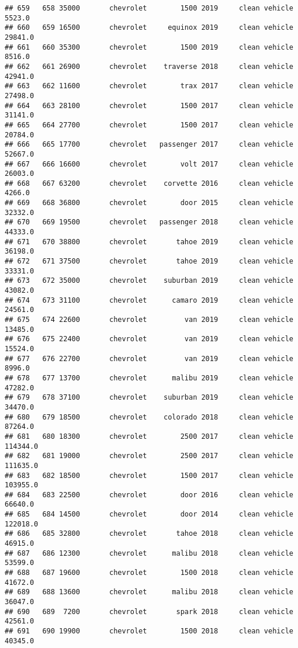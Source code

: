 \documentclass[
]{article}
\begin{document}
\begin{verbatim}
## 659   658 35000       chevrolet        1500 2019     clean vehicle    5523.0
## 660   659 16500       chevrolet     equinox 2019     clean vehicle   29841.0
## 661   660 35300       chevrolet        1500 2019     clean vehicle    8516.0
## 662   661 26900       chevrolet    traverse 2018     clean vehicle   42941.0
## 663   662 11600       chevrolet        trax 2017     clean vehicle   27498.0
## 664   663 28100       chevrolet        1500 2017     clean vehicle   31141.0
## 665   664 27700       chevrolet        1500 2017     clean vehicle   20784.0
## 666   665 17700       chevrolet   passenger 2017     clean vehicle   52667.0
## 667   666 16600       chevrolet        volt 2017     clean vehicle   26003.0
## 668   667 63200       chevrolet    corvette 2016     clean vehicle    4266.0
## 669   668 36800       chevrolet        door 2015     clean vehicle   32332.0
## 670   669 19500       chevrolet   passenger 2018     clean vehicle   44333.0
## 671   670 38800       chevrolet       tahoe 2019     clean vehicle   36198.0
## 672   671 37500       chevrolet       tahoe 2019     clean vehicle   33331.0
## 673   672 35000       chevrolet    suburban 2019     clean vehicle   43082.0
## 674   673 31100       chevrolet      camaro 2019     clean vehicle   24561.0
## 675   674 22600       chevrolet         van 2019     clean vehicle   13485.0
## 676   675 22400       chevrolet         van 2019     clean vehicle   15524.0
## 677   676 22700       chevrolet         van 2019     clean vehicle    8996.0
## 678   677 13700       chevrolet      malibu 2019     clean vehicle   47282.0
## 679   678 37100       chevrolet    suburban 2019     clean vehicle   34470.0
## 680   679 18500       chevrolet    colorado 2018     clean vehicle   87264.0
## 681   680 18300       chevrolet        2500 2017     clean vehicle  114344.0
## 682   681 19000       chevrolet        2500 2017     clean vehicle  111635.0
## 683   682 18500       chevrolet        1500 2017     clean vehicle  103955.0
## 684   683 22500       chevrolet        door 2016     clean vehicle   66640.0
## 685   684 14500       chevrolet        door 2014     clean vehicle  122018.0
## 686   685 32800       chevrolet       tahoe 2018     clean vehicle   46915.0
## 687   686 12300       chevrolet      malibu 2018     clean vehicle   53599.0
## 688   687 19600       chevrolet        1500 2018     clean vehicle   41672.0
## 689   688 13600       chevrolet      malibu 2018     clean vehicle   36047.0
## 690   689  7200       chevrolet       spark 2018     clean vehicle   42561.0
## 691   690 19900       chevrolet        1500 2018     clean vehicle   40345.0

\end{verbatim}
\end{document}
